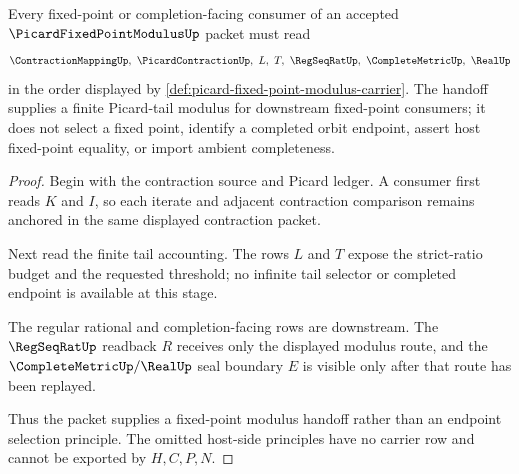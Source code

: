 \begin{theorem}
\label{thm:picard-fixed-point-modulus-tail-handoff}
Every fixed-point or completion-facing consumer of an accepted $\PicardFixedPointModulusUp$ packet must read
$$
\ContractionMappingUp,\ \PicardContractionUp,\ L,\ T,\ \RegSeqRatUp,\ \CompleteMetricUp,\ \RealUp
$$
in the order displayed by \autoref{def:picard-fixed-point-modulus-carrier}. The handoff supplies a finite Picard-tail modulus for downstream fixed-point consumers; it does not select a fixed point, identify a completed orbit endpoint, assert host fixed-point equality, or import ambient completeness.
\end{theorem}
\begin{proof}
Begin with the contraction source and Picard ledger. A consumer first reads $K$ and $I$, so each iterate and adjacent contraction comparison remains anchored in the same displayed contraction packet.

Next read the finite tail accounting. The rows $L$ and $T$ expose the strict-ratio budget and the requested threshold; no infinite tail selector or completed endpoint is available at this stage.

The regular rational and completion-facing rows are downstream. The $\RegSeqRatUp$ readback $R$ receives only the displayed modulus route, and the $\CompleteMetricUp/\RealUp$ seal boundary $E$ is visible only after that route has been replayed.

Thus the packet supplies a fixed-point modulus handoff rather than an endpoint selection principle. The omitted host-side principles have no carrier row and cannot be exported by $H,C,P,N$.
\end{proof}


\begin{closurestatus}{\PicardFixedPointModulusUp}
  \theoryclosure{\seedClosure}
  \formalstatus{\unformalizedV}
\end{closurestatus}
